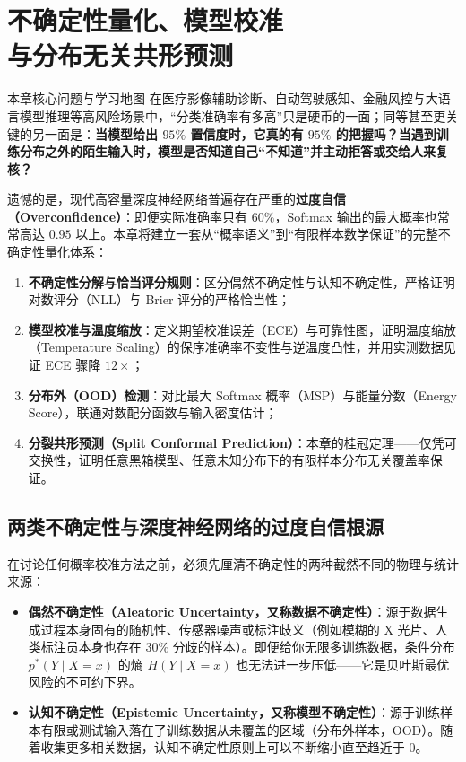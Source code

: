 \chapter[不确定性量化、模型校准与共形预测]{不确定性量化、模型校准\\与分布无关共形预测}\label{ch:calibration-conformal}


\begin{chapIntro}{本章核心问题与学习地图}
在医疗影像辅助诊断、自动驾驶感知、金融风控与大语言模型推理等高风险场景中，“分类准确率有多高”只是硬币的一面；同等甚至更关键的另一面是：\textbf{当模型给出 $95\%$ 置信度时，它真的有 $95\%$ 的把握吗？当遇到训练分布之外的陌生输入时，模型是否知道自己“不知道”并主动拒答或交给人来复核？}

遗憾的是，现代高容量深度神经网络普遍存在严重的\textbf{过度自信（Overconfidence）}：即便实际准确率只有 $60\%$，Softmax 输出的最大概率也常常高达 $0.95$ 以上。本章将建立一套从“概率语义”到“有限样本数学保证”的完整不确定性量化体系：
\begin{enumerate}
  \item \textbf{不确定性分解与恰当评分规则}：区分偶然不确定性与认知不确定性，严格证明对数评分（NLL）与 Brier 评分的严格恰当性；
  \item \textbf{模型校准与温度缩放}：定义期望校准误差（ECE）与可靠性图，证明温度缩放（Temperature Scaling）的保序准确率不变性与逆温度凸性，并用实测数据见证 ECE 骤降 $12\times$；
  \item \textbf{分布外（OOD）检测}：对比最大 Softmax 概率（MSP）与能量分数（Energy Score），联通对数配分函数与输入密度估计；
  \item \textbf{分裂共形预测（Split Conformal Prediction）}：本章的桂冠定理——仅凭可交换性，证明任意黑箱模型、任意未知分布下的有限样本分布无关覆盖率保证。
\end{enumerate}
\end{chapIntro}

\section{两类不确定性与深度神经网络的过度自信根源}

在讨论任何概率校准方法之前，必须先厘清不确定性的两种截然不同的物理与统计来源：

\begin{itemize}
  \item \textbf{偶然不确定性（Aleatoric Uncertainty，又称数据不确定性）}：源于数据生成过程本身固有的随机性、传感器噪声或标注歧义（例如模糊的 X 光片、人类标注员本身也存在 $30\%$ 分歧的样本）。即便给你无限多训练数据，条件分布 $p^*(Y \mid X=x)$ 的熵 $H(Y \mid X=x)$ 也无法进一步压低——它是贝叶斯最优风险的不可约下界。
  \item \textbf{认知不确定性（Epistemic Uncertainty，又称模型不确定性）}：源于训练样本有限或测试输入落在了训练数据从未覆盖的区域（分布外样本，OOD）。随着收集更多相关数据，认知不确定性原则上可以不断缩小直至趋近于 $0$。
\end{itemize}

